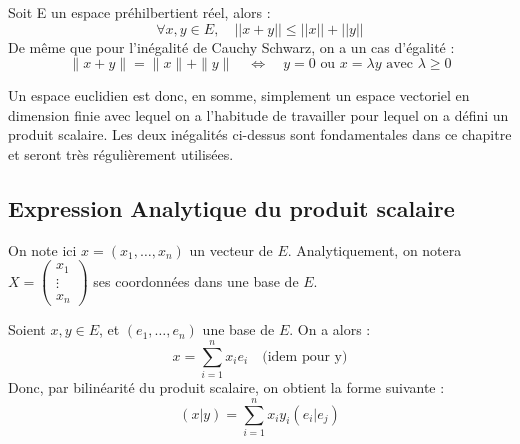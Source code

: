 \begin{proposition}
    Soit E un espace préhilbertient réel, alors : \[ \forall x, y \in E, \quad \boxed{ ||x + y|| \leqslant||x|| + ||y|| } \] 
    De même que pour l'inégalité de Cauchy Schwarz, on a un cas d'égalité :
        \[ \| x + y \| = \| x \| + \| y \| \quad \iff \quad y = 0 \text{ ou } x = \lambda y \text{ avec } \lambda \geqslant 0 \] 
\end{proposition}

\begin{remark}
    Un espace euclidien est donc, en somme, simplement un espace vectoriel en dimension finie avec lequel on a l'habitude de travailler 
    pour lequel on a défini un produit scalaire. 
    Les deux inégalités ci-dessus sont fondamentales dans ce chapitre et seront très régulièrement utilisées. 
\end{remark}


\subsection{Expression Analytique du produit scalaire}

On note ici $x = (x_1, \dots, x_n)$ un vecteur de $E$. Analytiquement, on notera 
$X = \begin{pmatrix} x_1 \\ \vdots \\ x_n \end{pmatrix}$ ses coordonnées dans une base de $E$. 

\begin{proposition}
    Soient $x,y \in E$, et $(e_1, \dots, e_n)$ une base de $E$. 
    On a alors :
        \[ x = \sum_{i=1}^{n} x_i e_i \quad \text{(idem pour y)}\] 
    Donc, par bilinéarité du produit scalaire, on obtient la forme suivante :
        \[(x|y) = \sum_{i=1}^{n} x_i y_i (e_i|e_j) \] 
\end{proposition}

